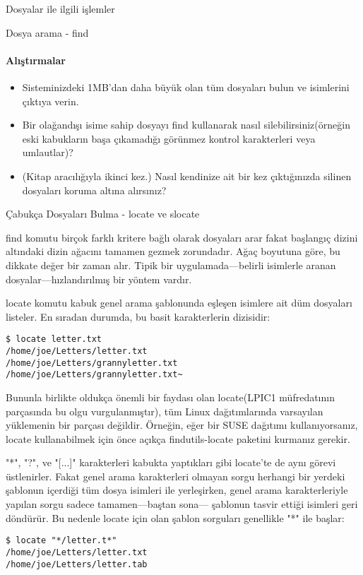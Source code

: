 \documentclass[10pt,a5paper]{book}
\begin{document}
\begin{section}{Dosyalar ile ilgili işlemler}
\begin{subsection}{Dosya arama - find}
\paragraph{Alıştırmalar}{
\begin{itemize}
 \item Sisteminizdeki 1MB'dan daha büyük olan tüm dosyaları bulun ve isimlerini çıktıya verin.
 \item Bir olağandışı isime sahip dosyayı find kullanarak nasıl silebilirsiniz(örneğin eski kabukların başa çıkamadığı görünmez kontrol karakterleri veya umlautlar)?
 \item (Kitap aracılığıyla ikinci kez.) Nasıl kendinize ait bir kez çıktığınızda silinen dosyaları koruma altına alırsınız?
\end{itemize}}
\end{subsection}
\begin{subsection}{Çabukça Dosyaları Bulma - locate ve slocate}

find komutu birçok farklı kritere bağlı olarak dosyaları arar fakat başlangıç dizini altındaki dizin ağacını tamamen gezmek zorundadır. Ağaç boyutuna göre, bu dikkate değer bir zaman alır. Tipik bir uygulamada—belirli isimlerle aranan dosyalar—hızlandırılmış bir yöntem vardır.

locate komutu kabuk genel arama şablonunda eşleşen isimlere ait düm dosyaları listeler. En sıradan durumda, bu basit karakterlerin dizisidir:
\begin{verbatim}
$ locate letter.txt
/home/joe/Letters/letter.txt
/home/joe/Letters/grannyletter.txt
/home/joe/Letters/grannyletter.txt~
\end{verbatim}

Bununla birlikte oldukça önemli bir faydası olan locate(LPIC1 müfredatının parçasında bu olgu vurgulanmıştır), tüm Linux dağıtımlarında varsayılan yüklemenin bir parçası değildir. Örneğin, eğer bir SUSE dağıtımı kullanıyorsanız, locate kullanabilmek için önce açıkça findutils-locate paketini kurmanız gerekir.

"*", "?", ve "[...]" karakterleri kabukta yaptıkları gibi locate'te de aynı görevi üstlenirler. Fakat genel arama karakterleri olmayan sorgu herhangi bir yerdeki şablonun içerdiği tüm dosya isimleri ile yerleşirken, genel arama karakterleriyle yapılan sorgu sadece tamamen—baştan sona— şablonun tasvir ettiği isimleri geri döndürür. Bu nedenle locate için olan şablon sorguları genellikle "*" ile başlar:
\begin{verbatim}
$ locate "*/letter.t*"
/home/joe/Letters/letter.txt
/home/joe/Letters/letter.tab
\end{verbatim}


\end{subsection}
\end{section}
\end{document}
